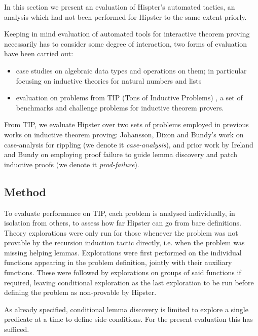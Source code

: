\label{sec:evaluation}

In this section we present an evaluation of Hispter's automated tactics, an analysis which had not been performed for Hipster to the same extent priorly.

Keeping in mind evaluation of automated tools for interactive theorem proving necessarily has to consider some degree of interaction, two forms of evaluation have been carried out:

\begin{itemize}
\item case studies on algebraic data types and operations on them; in particular focusing on inductive theories for natural numbers and lists

\item evaluation on problems from  TIP (Tons of Inductive Problems) \cite{tip-benchmarks}, a set of benchmarks and challenge problems for inductive theorem provers.
\end{itemize}

From TIP, we evaluate Hipster over two sets of problems employed in previous works on inductive theorem proving: Johansson, Dixon and Bundy's work on case-analysis for rippling \cite{IsaPcase} (we denote it \emph{case-analysis}), and prior work by Ireland and Bundy on employing proof failure to guide lemma discovery and patch inductive proofs \cite{productiveuse} (we denote it \emph{prod-failure}).

\subsection{Method}

To evaluate performance on TIP, each problem is analysed individually, in isolation from others, to assess how far Hipster can go from bare definitions.
%
Theory explorations were only run for those whenever the problem was not provable by the recursion induction tactic directly, i.e. when the problem was missing helping lemmas.
%
Explorations were first performed on the individual functions appearing in the problem definition, jointly with their auxiliary functions. These were followed by explorations on groups of said functions if required, leaving conditional exploration as the last exploration to be run before defining the problem as non-provable by Hipster.

As already specified, conditional lemma discovery is limited to explore a single predicate at a time to define side-conditions. For the present evaluation this has sufficed.

